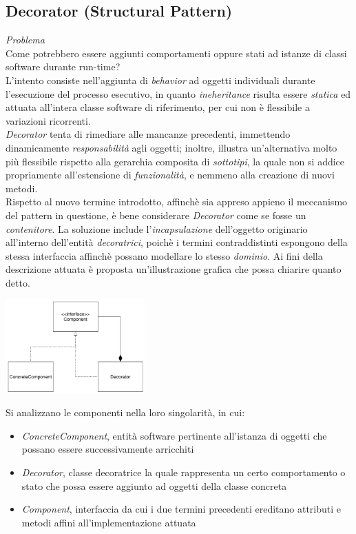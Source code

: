 \documentclass{article}
\begin{document}
\subsection*{Decorator (Structural Pattern)}
\large
\textit{Problema}\\
Come potrebbero essere aggiunti comportamenti oppure stati ad istanze di classi software durante run-time?\vspace*{14pt}\\
L'intento consiste nell'aggiunta di \textit{behavior} ad oggetti individuali durante l'esecuzione del processo esecutivo, in quanto \textit{ineheritance} risulta essere \textit{statica} ed attuata all'intera classe software di riferimento, per cui non è flessibile a variazioni ricorrenti.\vspace*{7pt}\\
\textit{Decorator} tenta di rimediare alle mancanze precedenti, immettendo dinamicamente \textit{responsabilità} agli oggetti; inoltre, illustra un'alternativa molto più flessibile rispetto alla gerarchia composita di \textit{sottotipi}, la quale non si addice propriamente all'estensione di \textit{funzionalità}, e nemmeno alla creazione di nuovi metodi.\vspace*{7pt}\\
Rispetto al nuovo termine introdotto, affinchè sia appreso appieno il meccanismo del pattern in questione, è bene considerare \textit{Decorator} come se fosse un \textit{contenitore}. La soluzione include l'\textit{incapsulazione} dell'oggetto originario all'interno dell'entità \textit{decoratrici}, poichè i termini contraddistinti espongono della stessa interfaccia affinchè possano modellare lo stesso \textit{dominio}. Ai fini della descrizione attuata è proposta un'illustrazione grafica che possa chiarire quanto detto.
\begin{center}
    \includegraphics[width=0.4\textwidth]{foto 5.png}
\end{center} 
Si analizzano le componenti nella loro singolarità, in cui:
\begin{itemize}[label={-}]
    \itemsep0em
    \item \textit{ConcreteComponent}, entità software pertinente all'istanza di oggetti che possano essere successivamente arricchiti  
    \item \textit{Decorator}, classe decoratrice la quale rappresenta un certo comportamento o stato che possa essere aggiunto ad oggetti della classe concreta 
    \item \textit{Component}, interfaccia da cui i due termini precedenti ereditano attributi e metodi affini all'implementazione attuata
\end{itemize}
\end{document}
